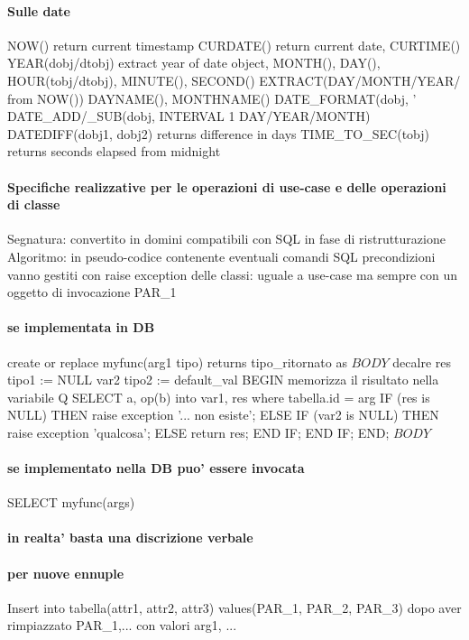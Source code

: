 \documentclass[12pt]{article}
\begin{document}
\paragraph{Sulle date}
					NOW() return current timestamp 
					CURDATE() return current date, CURTIME()
					YEAR(dobj/dtobj) extract year of date object, MONTH(), DAY(), HOUR(tobj/dtobj), MINUTE(), SECOND()
					EXTRACT(DAY/MONTH/YEAR/ from NOW())
					DAYNAME(), MONTHNAME()
					DATE_FORMAT(dobj, '%
					DATE_ADD/_SUB(dobj, INTERVAL 1 DAY/YEAR/MONTH)
					DATEDIFF(dobj1, dobj2) returns difference in days 
					TIME_TO_SEC(tobj) returns seconds elapsed from midnight

\paragraph{Specifiche realizzative per le operazioni di use-case e delle operazioni di classe}
			Segnatura: convertito in domini compatibili con SQL in fase di ristrutturazione
			Algoritmo: in pseudo-codice contenente eventuali comandi SQL
				precondizioni vanno gestiti con raise exception
				delle classi: uguale a use-case ma sempre con un oggetto di invocazione PAR_1
\paragraph{se implementata in DB}
					create or replace myfunc(arg1 tipo)
						returns tipo_ritornato as $BODY$
					decalre 
						res tipo1 := NULL
						var2 tipo2 := default_val
					BEGIN
						memorizza il risultato nella variabile Q 
						SELECT a, op(b) into var1, res
						where tabella.id = arg 
						IF (res is NULL) THEN raise exception '... non esiste';
							ELSE
								IF (var2 is NULL) THEN raise exception 'qualcosa';
								ELSE 
									return res;
								END IF;
						END IF;
					END; $BODY$
\paragraph{se implementato nella DB puo' essere invocata}
					SELECT myfunc(args)
\paragraph{in realta' basta una discrizione verbale}
\paragraph{per nuove ennuple}
					Insert into tabella(attr1, attr2, attr3) values(PAR_1, PAR_2, PAR_3) dopo aver rimpiazzato PAR_1,... con valori arg1, ...
\end{document}
